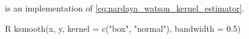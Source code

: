 \begin{defncbox}
    \begin{defnc}\label{defnc:ksmooth}
    is an implementation of \cref{eq:nardaya_watson_kernel_estimator}.
    \begin{mintlinebox}{R}
        ksmooth(x, y, kernel = c("box", "normal"), bandwidth = 0.5)
    \end{mintlinebox}
    \end{defnc}
\end{defncbox}
